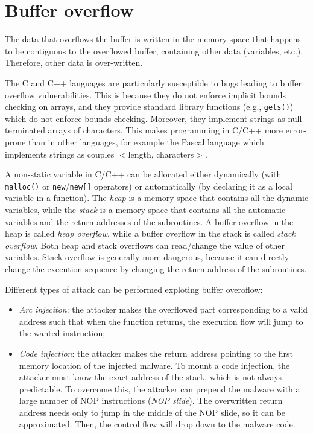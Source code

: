 \documentclass[a4paper,12pt]{article}
\begin{document}
\appendix

\section{Buffer overflow}
The data that overflows the buffer is written in the memory space that happens to be contiguous to the overflowed buffer, containing other data (variables, etc.). Therefore, other data is over-written.

The C and C++ languages are particularly susceptible to bugs leading to buffer overflow vulnerabilities. This is because they do not enforce implicit bounds checking on arrays, and they provide standard library functions (e.g., \texttt{gets()}) which do not enforce bounds checking. Moreover, they implement strings as null-terminated arrays of characters. This makes programming in C/C++ more error-prone than in other languages, for example the Pascal language which implements strings as couples $<$length, characters$>$.

A non-static variable in C/C++ can be allocated either dynamically (with \texttt{malloc()} or \texttt{new}/\texttt{new[]} operators) or automatically (by declaring it as a local variable in a function). The \textit{heap} is a memory space that contains all the dynamic variables, while the \textit{stack} is a memory space that contains all the automatic variables and the return addresses of the subroutines. A buffer overflow in the heap is called \textit{heap overflow}, while a buffer overflow in the stack is called \textit{stack overflow}. Both heap and stack overflows can read/change the value of other variables. Stack overflow is generally more dangerous, because it can directly change the execution sequence by changing the return address of the subroutines.

Different types of attack can be performed exploting buffer overoflow:
\begin{itemize}
	\item \textit{Arc injeciton}: the attacker makes the overflowed part corresponding to a valid address such that when the function returns, the execution flow will jump to the wanted instruction;
	\item \textit{Code injection}: the attacker makes the return address pointing to the first memory location of the injected malware. To mount a code injection, the attacker must know the exact address of the stack, which is not always predictable. To overcome this, the attacker can prepend the malware with a large number of NOP instructions (\textit{NOP slide}). The overwritten return address needs only to jump in the middle of the NOP slide, so it can be approximated. Then, the control flow will drop down to the malware code.
\end{itemize}
\end{document}

